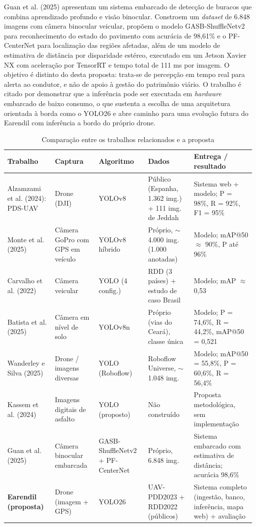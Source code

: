 \documentclass[12pt]{article}
\newcommand{\fonte}[1]{%
  \vspace{2pt}\par\noindent{\footnotesize Fonte: #1}}
\begin{document}
Guan et al. (2025) apresentam um sistema embarcado de detecção de buracos
que combina aprendizado profundo e visão binocular. Constroem um
\emph{dataset} de 6.848 imagens com câmera binocular veicular, propõem o
modelo GASB-ShuffleNetv2 para reconhecimento do estado do pavimento com
acurácia de 98,61\% e o PF-CenterNet para localização das regiões
afetadas, além de um modelo de estimativa de distância por disparidade
estéreo, executado em um Jetson Xavier NX com aceleração por TensorRT e
tempo total de 111 ms por imagem. O objetivo é distinto do desta
proposta: trata-se de percepção em tempo real para alerta ao condutor, e
não de apoio à gestão do patrimônio viário. O trabalho é citado por
demonstrar que a inferência pode ser executada em \emph{hardware}
embarcado de baixo consumo, o que sustenta a escolha de uma arquitetura
orientada à borda como o YOLO26 e abre caminho para uma evolução futura
do Earendil com inferência a bordo do próprio drone.

\begin{table}[ht]
\centering
\caption{Comparação entre os trabalhos relacionados e a proposta}
\label{tab:comparacao}
\footnotesize
\setlength{\tabcolsep}{3pt}
\renewcommand{\arraystretch}{1.15}
\begin{tabular}{p{2.4cm} p{2.0cm} p{1.9cm} p{3.2cm} p{3.6cm}}
\hline
\textbf{Trabalho} & \textbf{Captura} & \textbf{Algoritmo} &
\textbf{Dados} & \textbf{Entrega / resultado} \\
\hline
Alzamzami et al. (2024): PDS-UAV &
Drone (DJI) &
YOLOv8 &
Público (Espanha, 1.362 img.) + 111 img. de Jeddah &
Sistema web + modelo; P = 98\%, R = 92\%, F1 = 95\% \\
\hline
Monte et al. (2025) &
Câmera GoPro com GPS em veículo &
YOLOv8 híbrido &
Próprio, $\sim$4.000 img. (1.000 anotadas) &
Modelo; mAP@50 $\approx$ 90\%, P até 96\% \\
\hline
Carvalho et al. (2022) &
Câmera veicular &
YOLO (4 config.) &
RDD (3 países) + estudo de caso Brasil &
Modelo; mAP $\approx$ 0,53 \\
\hline
Batista et al. (2025) &
Câmera em nível de solo &
YOLOv8n &
Próprio (vias do Ceará), classe única &
Modelo; P = 74,6\%, R = 44,2\%, mAP@50 = 0,521 \\
\hline
Wanderley e Silva (2025) &
Drone / imagens diversas &
YOLO (Roboflow) &
Roboflow Universe, $\sim$1.048 img. &
Modelo; mAP@50 = 55,8\%, P = 60,6\%, R = 56,4\% \\
\hline
Kassem et al. (2024) &
Imagens digitais de asfalto &
YOLO (proposto) &
Não construído &
Proposta metodológica, sem implementação \\
\hline
Guan et al. (2025) &
Câmera binocular embarcada &
GASB-Shuffle\-Netv2 + PF-CenterNet &
Próprio, 6.848 img. &
Sistema embarcado com estimativa de distância; acurácia 98,6\% \\
\hline
\textbf{Earendil (proposta)} &
Drone (imagem + GPS) &
YOLO26 &
UAV-PDD2023 + RDD2022 (públicos) &
Sistema completo (ingestão, banco, inferência, mapa web) + avaliação \\
\hline
\end{tabular}
\fonte{elaborado pelo autor, 2026.}
\end{table}
\end{document}
